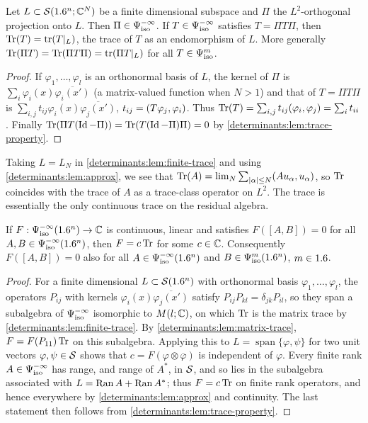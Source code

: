 \begin{lemma}\label{determinants:lem:finite-trace}
  Let $L\subset\mathcal{S}(1.6^n;\mathbb{C}^N)$ be a finite dimensional subspace and $\Pi$ the
  $L^2$-orthogonal projection onto $L$. Then $\Pi\in\Psi^{-\infty}_{\mathrm{iso}}$. If
  $T\in\Psi^{-\infty}_{\mathrm{iso}}$ satisfies $T=\Pi T\Pi$, then $\operatorname{Tr}(T)=\operatorname{tr}(T|_L)$, the
  trace of $T$ as an endomorphism of $L$. More generally
  $\operatorname{Tr}(\Pi T)=\operatorname{Tr}(\Pi T\Pi)=\operatorname{tr}(\Pi T|_L)$ for all $T\in\Psi^{m}_{\mathrm{iso}}$.
\end{lemma}
\begin{proof}
  If $\varphi_1,\dots,\varphi_l$ is an orthonormal basis of $L$, the kernel of
  $\Pi$ is $\sum_i\varphi_i(x)\overline{\varphi_i(x')}$ (a matrix-valued
  function when $N>1$) and that of $T=\Pi T\Pi$ is
  $\sum_{i,j}t_{ij}\varphi_i(x)\overline{\varphi_j(x')}$, $t_{ij}=( T\varphi_j, \varphi_i)$.
  Thus $\operatorname{Tr}(T)=\sum_{i,j}t_{ij}( \varphi_i, \varphi_j)=\sum_it_{ii}$.
  Finally $\operatorname{Tr}(\Pi T(\operatorname{Id}-\Pi))=\operatorname{Tr}(T(\operatorname{Id}-\Pi)\Pi)=0$ by
  \cref{determinants:lem:trace-property}.
\end{proof}

Taking $L=L_N$ in \cref{determinants:lem:finite-trace} and using
\cref{determinants:lem:approx}, we see that
$\operatorname{Tr}(A)=\lim_N\sum_{\lvert \alpha\rvert\le N}( Au_\alpha, u_\alpha)$, so $\operatorname{Tr}$
coincides with the trace of $A$ as a trace-class operator on $L^2$. The trace
is essentially the only continuous trace on the residual algebra.

\begin{proposition}\label{determinants:prop:trace-unique}
  If $F:\Psi^{-\infty}_{\mathrm{iso}}(1.6^n)\to\mathbb{C}$ is continuous, linear and satisfies
  $F([A,B])=0$ for all $A,B\in\Psi^{-\infty}_{\mathrm{iso}}(1.6^n)$, then $F=c\operatorname{Tr}$ for some
  $c\in\mathbb{C}$. Consequently $F([A,B])=0$ also for all $A\in\Psi^{-\infty}_{\mathrm{iso}}(1.6^n)$
  and $B\in\Psi^{m}_{\mathrm{iso}}(1.6^n)$, $m\in1.6$.
\end{proposition}
\begin{proof}
  For a finite dimensional $L\subset\mathcal{S}(1.6^n)$ with orthonormal basis
  $\varphi_1,\dots,\varphi_l$, the operators $P_{ij}$ with kernels
  $\varphi_i(x)\overline{\varphi_j(x')}$ satisfy $P_{ij}P_{kl}=\delta_{jk}P_{il}$,
  so they span a subalgebra of $\Psi^{-\infty}_{\mathrm{iso}}$ isomorphic to $M(l;\mathbb{C})$, on
  which $\operatorname{Tr}$ is the matrix trace by \cref{determinants:lem:finite-trace}. By
  \cref{determinants:lem:matrix-trace}, $F=F(P_{11})\operatorname{Tr}$ on this subalgebra.
  Applying this to $L=\operatorname{span}\{\varphi,\psi\}$ for two unit vectors
  $\varphi,\psi\in\mathcal{S}$ shows that $c=F(\varphi\otimes\overline\varphi)$ is
  independent of $\varphi$. Every finite rank $A\in\Psi^{-\infty}_{\mathrm{iso}}$ has range,
  and range of $A^*$, in $\mathcal{S}$, and so lies in the subalgebra associated with
  $L=\operatorname{Ran} A+\operatorname{Ran} A^*$; thus $F=c\operatorname{Tr}$ on finite rank operators, and hence
  everywhere by \cref{determinants:lem:approx} and continuity. The last
  statement then follows from \cref{determinants:lem:trace-property}.
\end{proof}

